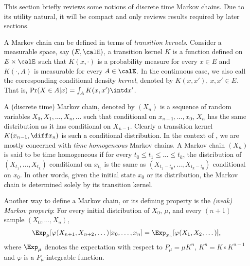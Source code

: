 This section briefly reviews some notions of discrete time Markov chains. Due
to its utility natural, it will be compact and only reviews results required
by later sections.

A Markov chain can be defined in terms of \emph{transition kernels}. Consider
a measurable space, say $(E,\calE)$, a transition kernel $K$ is a function defined
on $E\times\calE$ such that $K(x,\cdot)$ is a probability measure for every
$x\in E$ and $K(\cdot,A)$ is measurable for every $A\in\calE$. In the
continuous case, we also call the corresponding conditional density
\emph{kernel}, denoted by $K(x,x')$, $x,x'\in E$. That is, $\Pr(X\in A|x) =
\int_A K(x,x')\intd x'$.

A (discrete time) Markov chain, denoted by $(X_n)$ is a sequence of random
variables $X_0,X_1,\dots,X_n,\dots$ such that conditional on
$x_{n-1},\dots,x_0$, $X_n$ has the same distribution as it has conditional on
$X_{n-1}$. Clearly a transition kernel $K(x_{n-1},\diff x_n)$ is such a
conditional distribution. In the context of \mcmc, we are mostly concerned
with \emph{time homogeneous} Markov chains. A Markov chain $(X_n)$ is said to
be time homogeneous if for every $t_0\le t_1\le\dots\le t_k$, the distribution
of $(X_{t_1},\dots,X_{t_k})$ conditional on $x_{t_0}$ is the same as
$(X_{t_1-t_0},\dots,X_{t_k-t_0})$ conditional on $x_0$. In other words, given
the initial state $x_0$ or its distribution, the Markov chain is determined
solely by its transition kernel.

Another way to define a Markov chain, or its defining property is the
\emph{(weak) Markov property}: For every initial distribution of $X_0$, $\mu$,
and every $(n+1)$ sample $(X_0,\dots,X_n)$,
\begin{equation}
  \Exp_{\mu}[\varphi(X_{n+1},X_{n+2},\dots)|x_0,\dots,x_n] =
  \Exp_{x_n}[\varphi(X_1,X_2,\dots)],
\end{equation}
where $\Exp_{\mu}$ denotes the expectation with respect to $P_{\mu} = \mu
K^n$, $K^n = K\vysmwhtcircle K^{n-1}$ and $\varphi$ is a $P_{\mu}$-integrable
function.

